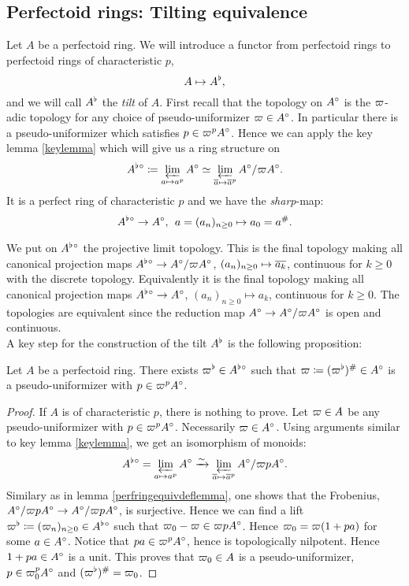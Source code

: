 \subsection{Perfectoid rings: Tilting equivalence}

Let $A$ be a perfectoid ring. We will introduce a functor from perfectoid rings to perfectoid rings of characteristic $p$,
\[A\mapsto A^{\flat},\]
and we will call $A^{\flat}$ the \textit{tilt} of $A$. 
First recall that the topology on $A{^{\circ}}$ is the $\varpi$-adic topology for any choice of pseudo-uniformizer $\varpi\in A{^{\circ}}$. In particular 
there is a pseudo-uniformizer which satisfies $p\in\varpi^pA{^{\circ}}$. Hence we can apply the key lemma \ref{keylemma} which will give us a ring structure on
\[A^{\flat}{^{\circ}}\coloneqq \varprojlim_{a\mapsto a^p}A{^{\circ}} \simeq \varprojlim_{\overline{a}\mapsto\overline{a}^p}A{^{\circ}}/\varpi A{^{\circ}}.\]
It is a perfect ring of characteristic $p$ and we have the \emph{sharp}-map:
\[A^{\flat}{^{\circ}}\to A{^{\circ}},\:\:a=(a_n)_{n\geq0}\mapsto a_0=a^{\#}.\]


We put on $A^{\flat}{^{\circ}}$ the projective limit topology. This is the final topology making all canonical projection maps
$A^{\flat}{^{\circ}}\to A{^{\circ}}/\varpi A{^{\circ}}$, $(a_n)_{n\geq0}\mapsto \overline{a_k}$, continuous for $k\geq0$ with the discrete topology. Equivalently it is the final topology making all canonical projection maps
$A^{\flat}{^{\circ}}\to A{^{\circ}}$, $(a_n)_{n\geq0}\mapsto a_k$, continuous for $k\geq0$. The topologies are equivalent since the reduction map
$A{^{\circ}}\to A{^{\circ}}/\varpi A{^{\circ}}$ is open and continuous.\\

A key step for the construction of the tilt $A^{\flat}$ is the following proposition:

\begin{prop}
Let $A$ be a perfectoid ring. There exists $\varpi^{\flat}\in A^{\flat}{^{\circ}}$ such that $\varpi\coloneqq(\varpi^{\flat})^{\#}\in A{^{\circ}}$ is a pseudo-uniformizer
with $p\in\varpi^pA{^{\circ}}$.
\end{prop}
\begin{proof}
If $A$ is of characteristic $p$, there is nothing to prove.
Let $\varpi\in A$ be any pseudo-uniformizer with $p\in\varpi^p A{^{\circ}}$. Necessarily $\varpi\in A{^{\circ}}$.
Using arguments similar to key lemma \ref{keylemma}, we get an isomorphism of monoids:
\[A^{\flat}{^{\circ}} = \varprojlim_{a\mapsto a^p}A{^{\circ}} \xrightarrow{\sim} \varprojlim_{\overline{a}\mapsto \overline{a}^p}A{^{\circ}}/\varpi pA{^{\circ}}.\]
Similary as in lemma \ref{perfringequivdeflemma}, one shows that the Frobenius, $A{^{\circ}}/\varpi pA{^{\circ}}\to A{^{\circ}}/\varpi pA{^{\circ}}$, is surjective.
Hence we can find a lift $\varpi^{\flat}\coloneqq(\varpi_n)_{n\geq0}\in A^{\flat}{^{\circ}}$ such that $\varpi_0-\varpi\in\varpi pA{^{\circ}}$.
Hence $\varpi_0 = \varpi(1+pa)$ for some $a\in A{^{\circ}}$. Notice that $pa\in\varpi^pA{^{\circ}}$, hence is topologically nilpotent. 
Hence $1+pa\in A{^{\circ}}$ is a unit. 
This proves that $\varpi_0\in A$ is a pseudo-uniformizer, $p\in\varpi_0^pA{^{\circ}}$ and $(\varpi^{\flat})^{\#}=\varpi_0$.
\end{proof}


